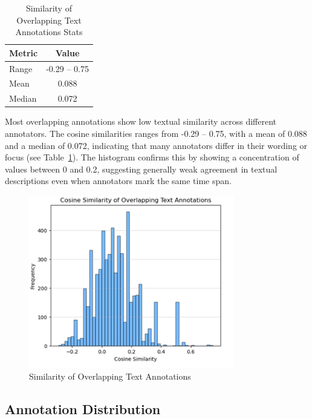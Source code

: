 \documentclass{article}
\begin{document}
\begin{table}[H]
  \caption{Similarity of Overlapping Text Annotations Stats}
  \label{tab:text_similarity}
  \centering
  \begin{tabular}{lc}
    \toprule
    Metric & Value \\
    \midrule
    Range & -0.29 -- 0.75 \\
    Mean & 0.088 \\
    Median & 0.072 \\
    \bottomrule
  \end{tabular}
\end{table}

Most overlapping annotations show low textual similarity across different annotators. The cosine similarities ranges from -0.29 -- 0.75, with a mean of 0.088 and a median of 0.072, indicating that many annotators differ in their wording or focus (see Table~\ref{tab:text_similarity}). The histogram confirms this by showing a concentration of values between 0 and 0.2, suggesting generally weak agreement in textual descriptions even when annotators mark the same time span.

\begin{figure}[H]
  \centering
  \includegraphics[width=0.8\textwidth]{figures/annotation_quality/similarity_of_overlapping_text_annotations.png}
  \caption{Similarity of Overlapping Text Annotations}
  \label{fig:text_similarity}
\end{figure}

\subsection{Annotation Distribution}
\end{document}
